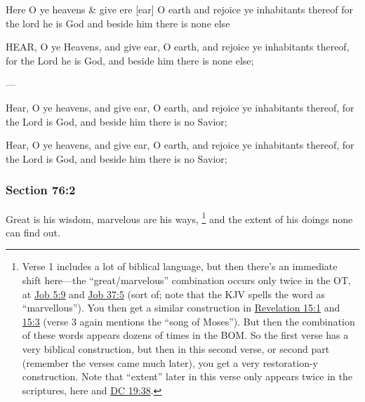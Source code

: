 		\begin{framed}
		\scriptsize
			\begin{compactdesc}
				\item[JSP] Here O ye heavens \& give ere [ear] O earth and rejoice ye inhabitants thereof for the lord he is God and beside him there is none else
				\item[EMS] HEAR, O ye Heavens, and give ear, O earth, and rejoice ye inhabitants thereof, for the Lord he is God, and beside him there is none else;
				\item[BC] ---
				\item[DC 1835] Hear, O ye heavens, and give ear, O earth, and rejoice ye inhabitants thereof, for the Lord is God, and beside him there is no Savior;
				\item[DC 1844] Hear, O ye heavens, and give ear, O earth, and rejoice ye inhabitants thereof, for the Lord is God, and beside him there is no Savior;
			\end{compactdesc}
		\end{framed}

	\subsubsection{Section 76:2} %
		\label{DC76-2}

		Great is his wisdom, marvelous are his ways,%
			\footnote{%
				\label{DC76-2-marvelous}%
				Verse 1 includes a lot of biblical language, but then there's an immediate shift here---the ``great/marvelous'' combination occurs only twice in the OT, at \hyperref[JOB-5-9]{Job 5:9} and \hyperref[JOB-37-5]{Job 37:5} (sort of; note that the KJV spells the word as ``marvellous''). You then get a similar construction in \hyperref[REVELATIONNT-15-1]{Revelation 15:1} and \hyperref[REVELATIONNT-15-3]{15:3} (verse 3 again mentions the ``song of Moses''). But then the combination of these words appears dozens of times in the BOM. So the first verse has a very biblical construction, but then in this second verse, or second part (remember the verses came much later), you get a very restoration-y construction. Note that ``extent'' later in this verse only appears twice in the scriptures, here and \hyperref[DC19-38]{DC 19:38}.
				}
		and the extent of his doings none can find out.


